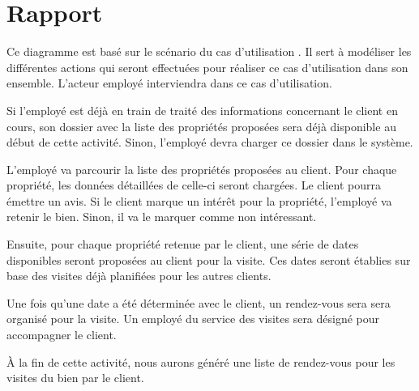 \section{Rapport}

Ce diagramme est basé sur le scénario du cas d'utilisation \selectedusecase{}. Il sert à modéliser les différentes actions qui seront effectuées pour réaliser ce cas d'utilisation dans son ensemble. L'acteur \og{}employé\fg{} interviendra dans ce cas d'utilisation.

Si l'employé est déjà en train de traité des informations concernant le client en cours, son dossier avec la liste des propriétés proposées sera déjà disponible au début de cette activité. Sinon, l'employé devra charger ce dossier dans le système.

L'employé va parcourir la liste des propriétés proposées au client. Pour chaque propriété, les données détaillées de celle-ci seront chargées. Le client pourra émettre un avis. Si le client marque un intérêt pour la propriété, l'employé va retenir le bien. Sinon, il va le marquer comme non intéressant.

Ensuite, pour chaque propriété retenue par le client, une série de dates disponibles seront proposées au client pour la visite. Ces dates seront établies sur base des visites déjà planifiées pour les autres clients.

Une fois qu'une date a été déterminée avec le client, un rendez-vous sera sera organisé pour la visite. Un employé du service des visites sera désigné pour accompagner le client.

À la fin de cette activité, nous aurons généré une liste de rendez-vous pour les visites du bien par le client.